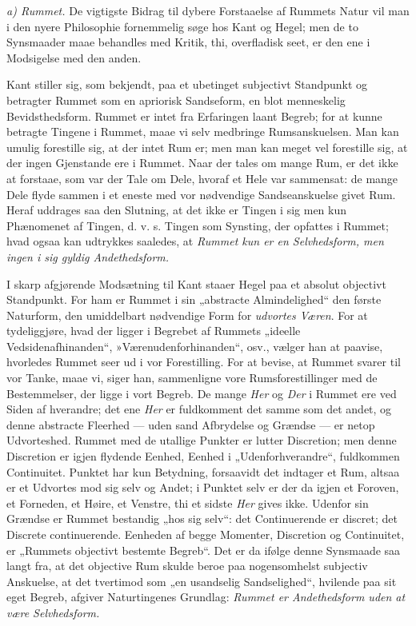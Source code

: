 \documentclass[12pt,a4paper]{book}
\newcommand{\runin}[1]{\emph{#1}\hspace{0.4em}}
\begin{document}
\runin{a) Rummet.} De vigtigste Bidrag til dybere Forstaaelse af
Rummets Natur vil man i den nyere Philosophie
fornemmelig søge hos Kant og Hegel; men de to Synsmaader maae
behandles med Kritik, thi, overfladisk seet, er den ene i Modsigelse
med den anden.

Kant stiller sig, som bekjendt, paa et ubetinget subjectivt Standpunkt
og betragter Rummet som en apriorisk Sandseform, en blot menneskelig
Bevidsthedsform. Rummet er intet fra Erfaringen laant Begreb; for at
kunne betragte Tingene i Rummet, maae vi selv medbringe
Rumsanskuelsen. Man kan umulig forestille sig, at der intet Rum er;
men man kan meget vel forestille sig, at der ingen Gjenstande ere i
Rummet. Naar der tales om mange Rum, er det ikke at forstaae, som var
der Tale om Dele, hvoraf et Hele var sammensat: de mange Dele flyde
sammen i et eneste med vor nødvendige Sandseanskuelse givet Rum. Heraf
uddrages saa den Slutning, at det ikke er Tingen i sig men kun
Phænomenet af Tingen, d. v. s. Tingen som Synsting, der opfattes i
Rummet; hvad ogsaa kan udtrykkes saaledes, at \emph{Rummet kun er en
Selvhedsform, men ingen i sig gyldig Andethedsform.}

I skarp afgjørende Modsætning til Kant staaer Hegel paa et absolut
objectivt Standpunkt. For ham er Rummet i sin „abstracte
Almindelighed“ den første Naturform, den umiddelbart nødvendige Form
for \emph{udvortes Væren}. For at tydeliggjøre, hvad der ligger i
Begrebet af Rummets „ideelle Vedsidenafhinanden“,
»Værenudenforhinanden“, osv., vælger han at paavise, hvorledes Rummet
seer ud i vor Forestilling. For at bevise, at Rummet svarer til vor
Tanke, maae vi, siger han, sammenligne vore Rumsforestillinger med de
Bestemmelser, der ligge i vort Begreb. De mange \emph{Her} og
\emph{Der} i Rummet ere ved Siden af hverandre; det ene \emph{Her} er
fuldkomment det samme som det andet, og denne abstracte Fleerhed ---
uden sand Afbrydelse og Grændse --- er netop Udvorteshed. Rummet med
de utallige Punkter er lutter Discretion; men denne Discretion er igjen
flydende
Eenhed, Eenhed i „Udenforhverandre“, fuldkommen Continuitet. Punktet
har kun Betydning, forsaavidt det indtager et Rum, altsaa er et
Udvortes mod sig selv og Andet; i Punktet selv er der da igjen et
Foroven, et Forneden, et Høire, et Venstre, thi et sidste \emph{Her}
gives ikke. Udenfor sin Grændse er Rummet bestandig „hos sig selv“:
det Continuerende er discret; det Discrete continuerende. Eenheden af
begge Momenter, Discretion og Continuitet, er „Rummets objectivt
bestemte Begreb“. Det er da ifølge denne Synsmaade saa langt fra, at
det objective Rum skulde beroe paa nogensomhelst subjectiv Anskuelse,
at det tvertimod som „en usandselig Sandselighed“, hvilende paa sit
eget Begreb, afgiver Naturtingenes Grundlag: \emph{Rummet er
Andethedsform uden at være Selvhedsform.}
\end{document}
